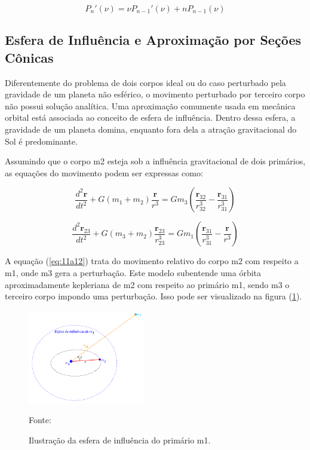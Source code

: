 \begin{equation}
P_n'(\nu)=\nu P_{n-1}'(\nu)+n P_{n-1}(\nu)
\label{eq:10a12}
\end{equation}

\subsection{Esfera de Influência e Aproximação por Seções Cônicas}

\par Diferentemente do problema de dois corpos ideal ou do caso perturbado pela gravidade de um planeta não esférico, o movimento perturbado por terceiro corpo não possui solução analítica. Uma aproximação comumente usada em mecânica orbital está associada ao conceito de esfera de influência. Dentro dessa esfera, a gravidade de um planeta domina, enquanto fora dela a atração gravitacional do Sol é predominante.

\par Assumindo que o corpo m2 esteja sob a influência gravitacional de dois primários, as equações do movimento podem ser expressas como:

\begin{equation}
\frac{d^2\mathbf{r}}{dt^2}+G(m_1+m_2)\frac{\mathbf{r}}{r^3}=Gm_3\left(\frac{\mathbf{r}_{32}}{r_{32}^3}-\frac{\mathbf{r}_{31}}{r_{31}^3}\right)
\label{eq:11a12}
\end{equation}

\begin{equation}
\frac{d^2\mathbf{r}_{23}}{dt^2}+G(m_3+m_2)\frac{\mathbf{r}_{23}}{r_{23}^3}=Gm_1\left(\frac{\mathbf{r}_{31}}{r_{31}^3}-\frac{\mathbf{r}}{r^3}\right)
\label{eq:12a12}
\end{equation}

\par A equação (\ref{eq:11a12}) trata do movimento relativo do corpo m2 com respeito a m1, onde m3 gera a perturbação. Este modelo subentende uma órbita aproximadamente kepleriana de m2 com respeito ao primário m1, sendo m3 o terceiro corpo impondo uma perturbação. Isso pode ser visualizado na figura (\ref{fig:esfera}).

\begin{figure}[h]
        \centering
        \includegraphics[width=2in]{figuras/esfera.png}
        \caption{ Ilustração da esfera de influência do primário m1.}
        \footnotesize Fonte: \cite{livro:andre}
        \label{fig:esfera}
\end{figure} 

